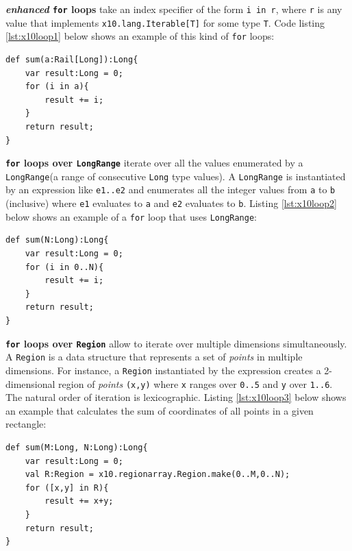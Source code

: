 \begin{description}

\item \textbf{\emph{enhanced} \texttt{for} loops} take an index 
specifier of the 
form \texttt{i in r}, where \texttt{r} is any
value that implements \texttt{x10.lang.Iterable[T]} for some type \texttt{T}.
Code listing \ref{lst:x10loop1} below shows 
an example of this kind of \texttt{for} loops:
\begin{lstlisting}[caption={Example of enhanced for loop},label={lst:x10loop1},language=x10,numbers=none]
def sum(a:Rail[Long]):Long{
	var result:Long = 0;
	for (i in a){
		result += i;
	}
	return result;
}
\end{lstlisting}

\item \textbf{\texttt{for} loops over \texttt{LongRange}} iterate over all the
values enumerated by a \texttt{\justify LongRange}(a range of consecutive
\texttt{Long} type values). A \texttt{LongRange} is instantiated by an
expression like \texttt{e1..e2} and enumerates all the integer values from
\texttt{a} to \texttt{b} (inclusive) where \texttt{e1} evaluates to \texttt{a}
and \texttt{e2} evaluates to \texttt{b}. Listing \ref{lst:x10loop2} below shows
an example of a \texttt{for} loop that uses \texttt{LongRange}:
\begin{lstlisting}[caption={Example of for loop over \texttt{LongRange}},label={lst:x10loop2},language=x10,numbers=none]
def sum(N:Long):Long{
	var result:Long = 0;
	for (i in 0..N){
		result += i;
	}
	return result;
}
\end{lstlisting}

\item \textbf{\texttt{for} loops over \texttt{Region}} allow to iterate over
multiple dimensions simultaneously. A \texttt{Region} is a data structure that
represents a set of \emph{points} in multiple dimensions. For instance, a
\texttt{Region} instantiated by the expression 
\texttt{}
creates a 2-dimensional region of \emph{points} \texttt{(x,y)} where \texttt{x}
ranges over \texttt{0..5} and \texttt{y} over \texttt{1..6}. The natural order
of iteration is lexicographic. Listing \ref{lst:x10loop3} below shows an example that calculates
the sum of coordinates of all points in a given rectangle:
\begin{lstlisting}[caption={Example of for loop over a 2-D \texttt{Region}},label={lst:x10loop3},language=x10,numbers=none]
def sum(M:Long, N:Long):Long{
	var result:Long = 0;
	val R:Region = x10.regionarray.Region.make(0..M,0..N);
	for ([x,y] in R){
		result += x+y;
	}
	return result;
}
\end{lstlisting}

 
\end{description}

